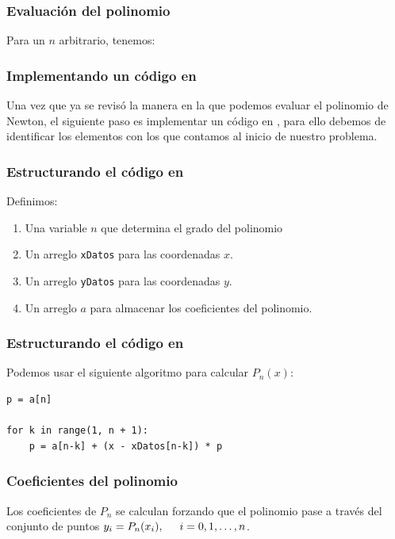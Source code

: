 \documentclass[12pt]{beamer}
\begin{document}
\begin{frame}
\frametitle{Evaluación del polinomio}
Para un $n$ arbitrario, tenemos:
\pause
{}
\end{frame}
\begin{frame}
\frametitle{Implementando un código en \python}
Una vez que ya se revisó la manera en la que podemos evaluar el polinomio de Newton, el siguiente paso es implementar un código en \python, para ello debemos de identificar los elementos con los que contamos al inicio de nuestro problema.
\end{frame}
\begin{frame}[fragile]
\frametitle{Estructurando el código en \python}
Definimos:
\begin{enumerate}[<+->]
\item Una variable $n$ que determina el grado del polinomio 
\item Un arreglo \texttt{xDatos} para las coordenadas $x$.
\item Un arreglo \texttt{yDatos} para las coordenadas $y$.
\item Un arreglo $a$ para almacenar los coeficientes del polinomio.
\end{enumerate}
\end{frame}
\begin{frame}[fragile]
\frametitle{Estructurando el código en \python}
Podemos usar el siguiente algoritmo para calcular $P_{n} (x)$:
\begin{lstlisting}[caption=Algoritmo para calcular $P_{n}$, basicstyle=\linespread{0.9}\ttfamily=\small, columns=fullflexible]
p = a[n]

for k in range(1, n + 1):
    p = a[n-k] + (x - xDatos[n-k]) * p
\end{lstlisting}
\end{frame}
\begin{frame}
\frametitle{Coeficientes del polinomio}
Los coeficientes de $P_{n}$ se calculan forzando que el polinomio pase a través del conjunto de puntos $y_{i} = P_{n} (x_{i}),\hspace{0.5cm} i = 0, 1, \ldots, n$. 
\end{frame}
\end{document}
